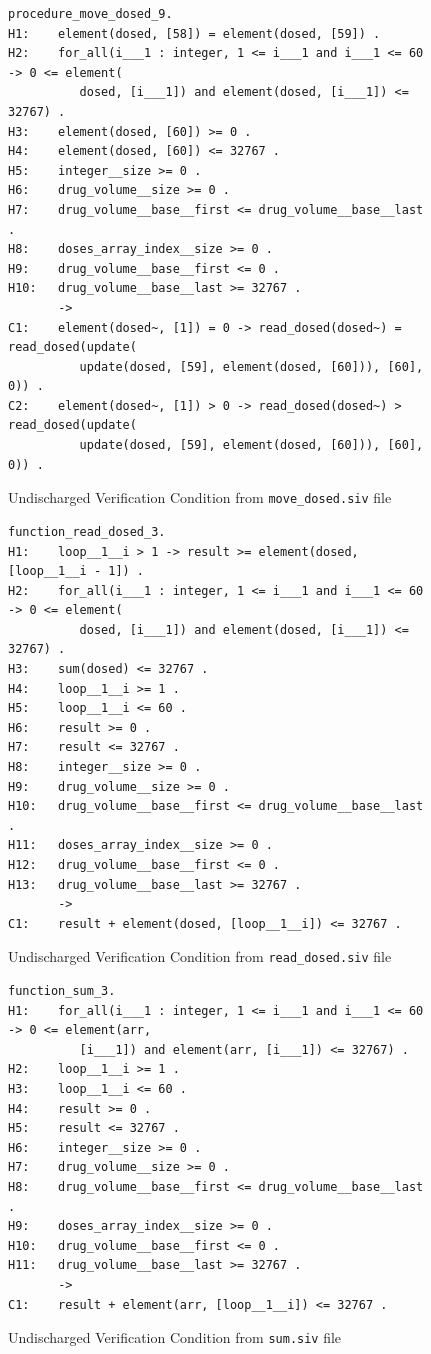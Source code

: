 \begin{figure}[h]
\singlespacing
\begin{lstlisting}[frame=single, gobble=0]
procedure_move_dosed_9.
H1:    element(dosed, [58]) = element(dosed, [59]) .
H2:    for_all(i___1 : integer, 1 <= i___1 and i___1 <= 60 -> 0 <= element(
          dosed, [i___1]) and element(dosed, [i___1]) <= 32767) .
H3:    element(dosed, [60]) >= 0 .
H4:    element(dosed, [60]) <= 32767 .
H5:    integer__size >= 0 .
H6:    drug_volume__size >= 0 .
H7:    drug_volume__base__first <= drug_volume__base__last .
H8:    doses_array_index__size >= 0 .
H9:    drug_volume__base__first <= 0 .
H10:   drug_volume__base__last >= 32767 .
       ->
C1:    element(dosed~, [1]) = 0 -> read_dosed(dosed~) = read_dosed(update(
          update(dosed, [59], element(dosed, [60])), [60], 0)) .
C2:    element(dosed~, [1]) > 0 -> read_dosed(dosed~) > read_dosed(update(
          update(dosed, [59], element(dosed, [60])), [60], 0)) .
\end{lstlisting}
\doublespacing
\caption{Undischarged Verification Condition from \lstinline{move_dosed.siv} file}
\label{listing:pcapump_undischarged_vc_move_dosed}
\end{figure}

\begin{figure}[h]
\singlespacing
\begin{lstlisting}[frame=single, gobble=0]
function_read_dosed_3.
H1:    loop__1__i > 1 -> result >= element(dosed, [loop__1__i - 1]) .
H2:    for_all(i___1 : integer, 1 <= i___1 and i___1 <= 60 -> 0 <= element(
          dosed, [i___1]) and element(dosed, [i___1]) <= 32767) .
H3:    sum(dosed) <= 32767 .
H4:    loop__1__i >= 1 .
H5:    loop__1__i <= 60 .
H6:    result >= 0 .
H7:    result <= 32767 .
H8:    integer__size >= 0 .
H9:    drug_volume__size >= 0 .
H10:   drug_volume__base__first <= drug_volume__base__last .
H11:   doses_array_index__size >= 0 .
H12:   drug_volume__base__first <= 0 .
H13:   drug_volume__base__last >= 32767 .
       ->
C1:    result + element(dosed, [loop__1__i]) <= 32767 .
\end{lstlisting}
\doublespacing
\caption{Undischarged Verification Condition from \lstinline{read_dosed.siv} file}
\label{listing:pcapump_undischarged_vc_read_dosed}
\end{figure}

\begin{figure}[h]
\singlespacing
\begin{lstlisting}[frame=single, gobble=0]
function_sum_3.
H1:    for_all(i___1 : integer, 1 <= i___1 and i___1 <= 60 -> 0 <= element(arr, 
          [i___1]) and element(arr, [i___1]) <= 32767) .
H2:    loop__1__i >= 1 .
H3:    loop__1__i <= 60 .
H4:    result >= 0 .
H5:    result <= 32767 .
H6:    integer__size >= 0 .
H7:    drug_volume__size >= 0 .
H8:    drug_volume__base__first <= drug_volume__base__last .
H9:    doses_array_index__size >= 0 .
H10:   drug_volume__base__first <= 0 .
H11:   drug_volume__base__last >= 32767 .
       ->
C1:    result + element(arr, [loop__1__i]) <= 32767 .
\end{lstlisting}
\doublespacing
\caption{Undischarged Verification Condition from \lstinline{sum.siv} file}
\label{listing:pcapump_undischarged_vc_sum}
\end{figure}

